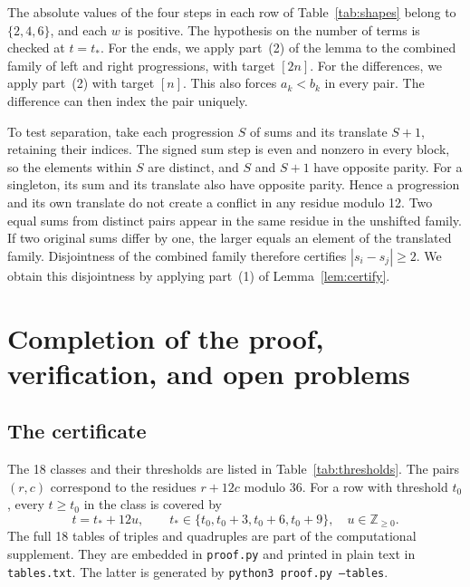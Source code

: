\documentclass[11pt]{amsart}
\begin{document}
The absolute values of the four steps in each row of
Table~\ref{tab:shapes} belong to \(\{2,4,6\}\), and each
\(w\) is positive. The hypothesis on the number of terms is
checked at \(t=t_*\). For the ends, we apply part~(2) of the
lemma to the combined family of left and right progressions,
with target \([2n]\). For the differences, we apply part~(2)
with target \([n]\). This also forces \(a_k<b_k\) in every
pair. The difference can then index the pair uniquely.

To test separation, take each progression \(S\) of sums and its
translate \(S+1\), retaining their indices. The signed sum step
is even and nonzero in every block, so the elements within
\(S\) are distinct, and \(S\) and \(S+1\) have opposite
parity. For a singleton, its sum and its translate also have
opposite parity. Hence a progression and its own translate
do not create a conflict in any residue modulo 12.
Two equal sums from distinct pairs appear in the same residue
in the unshifted family. If two original sums differ by one,
the larger equals an element of the translated family.
Disjointness of the combined family therefore certifies
\(|s_i-s_j|\ge2\). We obtain this disjointness by applying
part~(1) of Lemma~\ref{lem:certify}.

\section{Completion of the proof, verification, and open problems}

\subsection{The certificate}

The 18 classes and their thresholds are listed in
Table~\ref{tab:thresholds}. The pairs \((r,c)\) correspond to the
residues \(r+12c\) modulo 36. For a row with threshold \(t_0\),
every \(t\ge t_0\) in the class is covered by
\[
  t=t_*+12u,\qquad
  t_*\in\{t_0,t_0+3,t_0+6,t_0+9\},\quad
  u\in\mathbb Z_{\ge0}.
\]
The full 18 tables of triples and quadruples are part of the
computational supplement. They are embedded in \texttt{proof.py}
and printed in plain text in \texttt{tables.txt}. The latter is
generated by \texttt{python3 proof.py --tables}.
\end{document}
